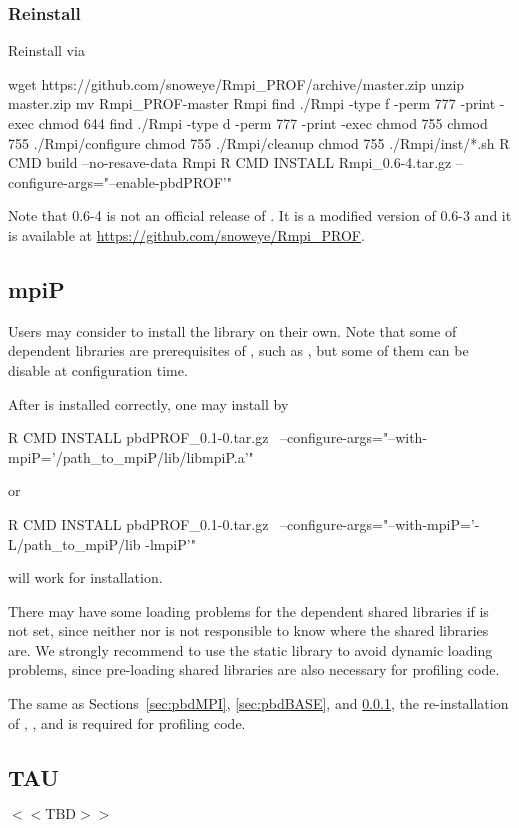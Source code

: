\subsubsection{Reinstall }
\label{sec:Rmpi}

Reinstall  via
\begin{Command}
wget https://github.com/snoweye/Rmpi_PROF/archive/master.zip
unzip master.zip
mv Rmpi_PROF-master Rmpi
find ./Rmpi -type f -perm 777 -print -exec chmod 644 {} \;
find ./Rmpi -type d -perm 777 -print -exec chmod 755 {} \;
chmod 755 ./Rmpi/configure
chmod 755 ./Rmpi/cleanup
chmod 755 ./Rmpi/inst/*.sh
R CMD build --no-resave-data Rmpi
R CMD INSTALL Rmpi_0.6-4.tar.gz --configure-args="--enable-pbdPROF'"
\end{Command}
Note that {\color{red} 0.6-4} is not an official release of .
It is a modified version of 0.6-3 and it is available at
\url{https://github.com/snoweye/Rmpi_PROF}.


\subsection{mpiP}
\label{sec:mpiP}

Users may consider to install the  library on their own.
Note that some of dependent libraries are prerequisites of ,
such as , but some of them can be disable at 
configuration time.

After  is installed correctly, one may install  by
\begin{Command}
R CMD INSTALL pbdPROF_0.1-0.tar.gz \
  --configure-args="--with-mpiP='/path_to_mpiP/lib/libmpiP.a'"
\end{Command}
or
\begin{Command}
R CMD INSTALL pbdPROF_0.1-0.tar.gz \
  --configure-args="--with-mpiP='-L/path_to_mpiP/lib -lmpiP'"
\end{Command}
will work for  installation.

{\color{red} There may have some loading problems for the dependent shared
libraries if  is not set,} since neither  nor
\pkg{pbdPROF} is not responsible to know where the shared libraries are.
We strongly recommend to use the static library to avoid dynamic loading
problems, since pre-loading shared libraries are also necessary for
profiling code.

The same as Sections~\ref{sec:pbdMPI}, \ref{sec:pbdBASE}, and \ref{sec:Rmpi},
the re-installation of , , and 
is required for profiling code.


\subsection{TAU}
\label{sec:TAU}

$<< \mbox{TBD} >>$
